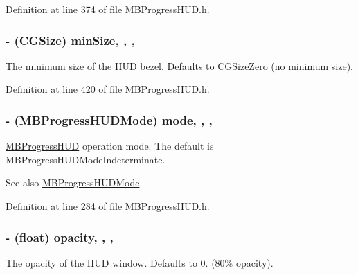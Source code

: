 Definition at line 374 of file M\+B\+Progress\+H\+U\+D.\+h.

\hypertarget{interface_m_b_progress_h_u_d_a69c6b2cad533d6fe7d90df02bf7f8b0c}{
\subsubsection[{min\+Size}]{\setlength{\rightskip}{0pt plus 5cm}-\/ (C\+G\+Size) min\+Size\hspace{0.3cm}{\ttfamily [read]}, {\ttfamily [write]}, {\ttfamily [atomic]}, {\ttfamily [assign]}}}\label{interface_m_b_progress_h_u_d_a69c6b2cad533d6fe7d90df02bf7f8b0c}
The minimum size of the H\+U\+D bezel. Defaults to C\+G\+Size\+Zero (no minimum size). 

Definition at line 420 of file M\+B\+Progress\+H\+U\+D.\+h.

\hypertarget{interface_m_b_progress_h_u_d_ace77eaaf507e86fe56436f7ee7b6fdc9}{
\subsubsection[{mode}]{\setlength{\rightskip}{0pt plus 5cm}-\/ ({\bf M\+B\+Progress\+H\+U\+D\+Mode}) mode\hspace{0.3cm}{\ttfamily [read]}, {\ttfamily [write]}, {\ttfamily [atomic]}, {\ttfamily [assign]}}}\label{interface_m_b_progress_h_u_d_ace77eaaf507e86fe56436f7ee7b6fdc9}
\hyperlink{interface_m_b_progress_h_u_d}{M\+B\+Progress\+H\+U\+D} operation mode. The default is M\+B\+Progress\+H\+U\+D\+Mode\+Indeterminate.

\begin{DoxySeeAlso}{See also}
\hyperlink{_m_b_progress_h_u_d_8h_a553b6bab1602fa03257edde8491bb621}{M\+B\+Progress\+H\+U\+D\+Mode} 
\end{DoxySeeAlso}


Definition at line 284 of file M\+B\+Progress\+H\+U\+D.\+h.

\hypertarget{interface_m_b_progress_h_u_d_a24ab5e37917e3489d6add081324a49ff}{
\subsubsection[{opacity}]{\setlength{\rightskip}{0pt plus 5cm}-\/ (float) opacity\hspace{0.3cm}{\ttfamily [read]}, {\ttfamily [write]}, {\ttfamily [atomic]}, {\ttfamily [assign]}}}\label{interface_m_b_progress_h_u_d_a24ab5e37917e3489d6add081324a49ff}
The opacity of the H\+U\+D window. Defaults to 0. (80\% opacity). 

